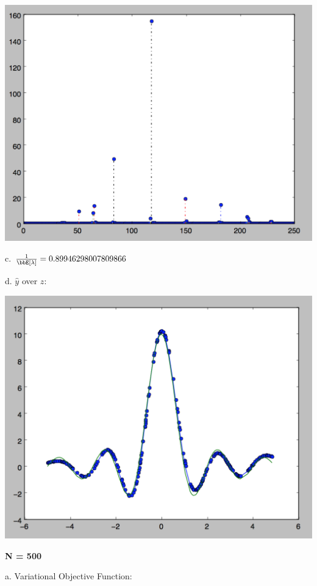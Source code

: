 \documentclass[twoside,11pt]{homework}
\begin{document}
\includegraphics[scale=.5]{images/2stem.png}

c. $\frac{1}{\bbE[\lambda]} = 0.89946298007809866$

d. $\hat{y}$ over $z$:

\includegraphics[scale=.5]{images/2yhat.png}


\textbf{N = 500}

a. Variational Objective Function:
\end{document}

